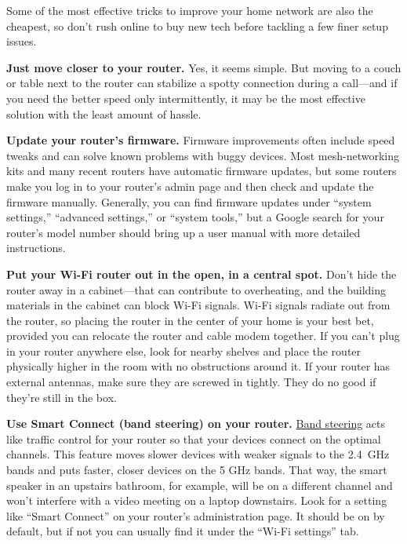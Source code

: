 Some of the most effective tricks to improve your home network are also
the cheapest, so don't rush online to buy new tech before tackling a few
finer setup issues.

\textbf{Just move closer to your router.} Yes, it seems simple. But
moving to a couch or table next to the router can stabilize a spotty
connection during a call---and if you need the better speed only
intermittently, it may be the most effective solution with the least
amount of hassle.

\textbf{Update your router's firmware.} Firmware improvements often
include speed tweaks and can solve known problems with buggy devices.
Most mesh-networking kits and many recent routers have automatic
firmware updates, but some routers make you log in to your router's
admin page and then check and update the firmware manually. Generally,
you can find firmware updates under ``system settings,'' ``advanced
settings,'' or ``system tools,'' but a Google search for your router's
model number should bring up a user manual with more detailed
instructions.

\textbf{Put your Wi-Fi router out in the open, in a central spot.} Don't
hide the router away in a cabinet---that can contribute to overheating,
and the building materials in the cabinet can block Wi-Fi signals. Wi-Fi
signals radiate out from the router, so placing the router in the center
of your home is your best bet, provided you can relocate the router and
cable modem together. If you can't plug in your router anywhere else,
look for nearby shelves and place the router physically higher in the
room with no obstructions around it. If your router has external
antennas, make sure they are screwed in tightly. They do no good if
they're still in the box.

\textbf{Use Smart Connect (band steering) on your router.}
\href{https://www.nytimes.com/wirecutter/reviews/best-wi-fi-router/\#flaws-but-not-dealbreakers}{Band
steering} acts like traffic control for your router so that your devices
connect on the optimal channels. This feature moves slower devices with
weaker signals to the 2.4~GHz bands and puts faster, closer devices on
the 5 GHz bands. That way, the smart speaker in an upstairs bathroom,
for example, will be on a different channel and won't interfere with a
video meeting on a laptop downstairs. Look for a setting like ``Smart
Connect'' on your router's administration page. It should be on by
default, but if not you can usually find it under the ``Wi-Fi settings''
tab.

